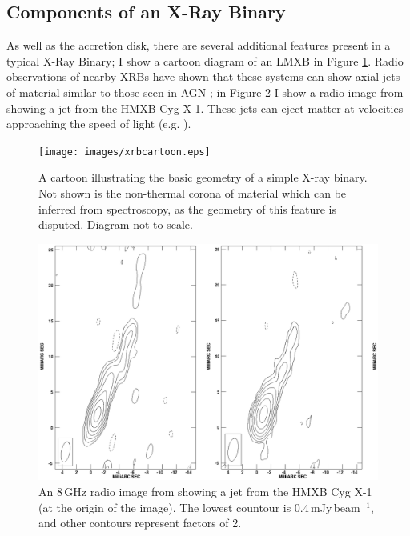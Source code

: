 \subsection{Components of an X-Ray Binary}

\par As well as the accretion disk, there are several additional features present in a typical X-Ray Binary; I show a cartoon diagram of an LMXB in Figure \ref{fig:xrbcartoon}.   Radio observations of nearby XRBs have shown that these systems can show axial jets of material similar to those seen in AGN \citep{Geldzahler_Jet}; in Figure \ref{fig:jet} I show a radio image from \citet{Stirling_Jet} showing a jet from the HMXB Cyg X-1. These jets can eject matter at velocities approaching the speed of light (e.g. \citealp{Mirabel_Microquasar}).

\begin{figure}
    \texttt{[image: images/xrbcartoon.eps]}
    \captionsetup{singlelinecheck=off}
    \caption[A cartoon illustrating the basic geometry of a simple X-ray binary.]{A cartoon illustrating the basic geometry of a simple X-ray binary.  Not shown is the non-thermal corona of material which can be inferred from spectroscopy, as the geometry of this feature is disputed.  Diagram not to scale.}
   \label{fig:xrbcartoon}
\end{figure}

\begin{figure}
   \centering
    \includegraphics[width=0.5\columnwidth, trim = 17mm 0mm 17mm 0mm, clip]{images/jet.eps}
    \captionsetup{singlelinecheck=off}
    \caption[An 8\,GHz radio image from \citet{Stirling_Jet} showing a jet from the HMXB Cyg X-1.]{An 8\,GHz radio image from \citet{Stirling_Jet} showing a jet from the HMXB Cyg X-1 (at the origin of the image).  The lowest countour is 0.4\,mJy\,beam$^{-1}$, and other contours represent factors of 2.}
   \label{fig:jet}
\end{figure}

